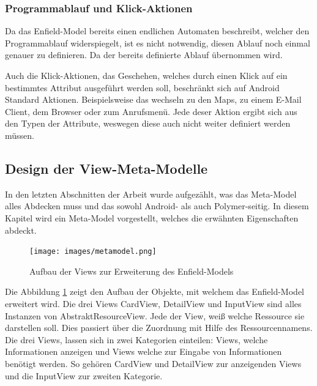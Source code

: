 \subsubsection{Programmablauf und Klick-Aktionen}

Da das Enfield-Model bereits einen endlichen Automaten beschreibt, welcher den Programmablauf widerspiegelt, ist es nicht notwendig, diesen Ablauf noch einmal genauer zu definieren. Da der bereits definierte Ablauf übernommen wird.

Auch die Klick-Aktionen, das Geschehen, welches durch einen Klick auf ein bestimmtes Attribut ausgeführt werden soll, beschränkt sich auf Android Standard Aktionen. Beispielsweise das wechseln zu den Maps, zu einem E-Mail Client, dem Browser oder zum Anrufsmenü. Jede deser Aktion ergibt sich aus den Typen der Attribute, weswegen diese auch nicht weiter definiert werden müssen.

\subsection{Design der View-Meta-Modelle}

In den letzten Abschnitten der Arbeit wurde aufgezählt, was das Meta-Model alles Abdecken muss und das sowohl Android- als auch Polymer-seitig. In diesem Kapitel wird ein Meta-Model vorgestellt, welches die erwähnten Eigenschaften abdeckt.


\begin{figure}[H]
	\begin{center}
		\texttt{[image: images/metamodel.png]}
		\caption{Aufbau der Views zur Erweiterung des Enfield-Models}
		\label{fig:meta-model}
	\end{center}
\end{figure}

Die Abbildung \ref{fig:meta-model} zeigt den Aufbau der Objekte, mit welchem das Enfield-Model erweitert wird. Die drei Views CardView, DetailView und InputView sind alles Instanzen von AbstraktResourceView. Jede der View, weiß welche Ressource sie darstellen soll. Dies passiert über die Zuordnung mit Hilfe des Ressourcennamens. Die drei Views, lassen sich in zwei Kategorien einteilen: Views, welche Informationen anzeigen und Views welche zur Eingabe von Informationen benötigt werden.
So gehören CardView und DetailView zur anzeigenden Views und die InputView zur zweiten Kategorie. 

